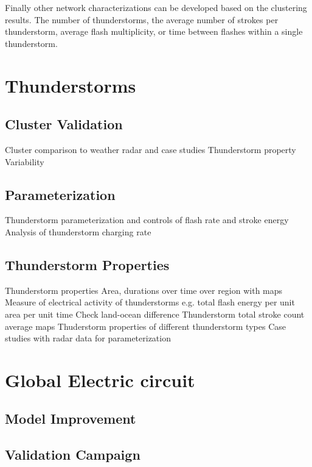 Finally other network characterizations can be developed based on the clustering results.
The number of thunderstorms, the average number of strokes per thunderstorm, average flash multiplicity, or time between flashes within a single thunderstorm.

\section{Thunderstorms}

\subsection{Cluster Validation}

Cluster comparison to weather radar and case studies
  Thunderstorm property Variability

\subsection{Parameterization}

  Thunderstorm parameterization and controls of flash rate and stroke energy
  Analysis of thunderstorm charging rate

\subsection{Thunderstorm Properties}

 Thunderstorm properties
  Area, durations over time over region with maps
  Measure of electrical activity of thunderstorms
     e.g. total flash energy per unit area per unit time
     Check land-ocean difference
  Thunderstorm total stroke count average maps
  Thuderstorm properties of different thunderstorm types
  Case studies with radar data for parameterization

\section{Global Electric circuit}

\subsection{Model Improvement}

\subsection{Validation Campaign}

